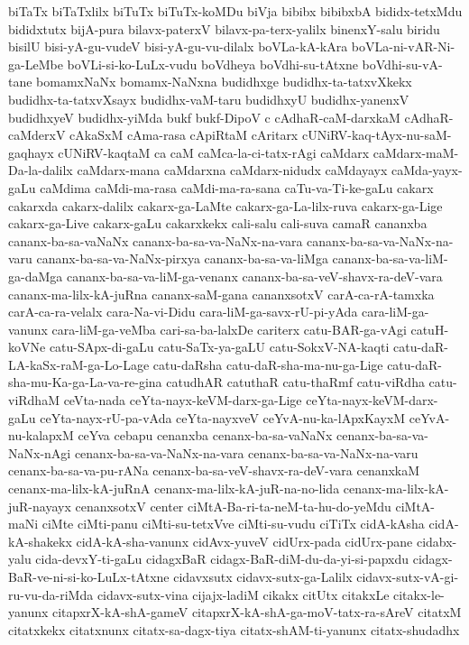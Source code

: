 {biTaTx
biTaTxlilx
biTuTx
biTuTx-koMDu
biVja
bibibx
bibibxbA
bididx-tetxMdu
bididxtutx
bijA-pura
bilavx-paterxV
bilavx-pa-terx-yalilx
binenxY-salu
biridu
bisilU
bisi-yA-gu-vudeV
bisi-yA-gu-vu-dilalx
boVLa-kA-kAra
boVLa-ni-vAR-Ni-ga-LeMbe
boVLi-si-ko-LuLx-vudu
boVdheya
boVdhi-su-tAtxne
boVdhi-su-vA-tane
bomamxNaNx
bomamx-NaNxna
budidhxge
budidhx-ta-tatxvXkekx
budidhx-ta-tatxvXsayx
budidhx-vaM-taru
budidhxyU
budidhx-yanenxV
budidhxyeV
budidhx-yiMda
bukf
bukf-DipoV
c
cAdhaR-caM-darxkaM
cAdhaR-caMderxV
cAkaSxM
cAma-rasa
cApiRtaM
cAritarx
cUNiRV-kaq-tAyx-nu-saM-gaqhayx
cUNiRV-kaqtaM
ca
caM
caMca-la-ci-tatx-rAgi
caMdarx
caMdarx-maM-Da-la-dalilx
caMdarx-mana
caMdarxna
caMdarx-nidudx
caMdayayx
caMda-yayx-gaLu
caMdima
caMdi-ma-rasa
caMdi-ma-ra-sana
caTu-va-Ti-ke-gaLu
cakarx
cakarxda
cakarx-dalilx
cakarx-ga-LaMte
cakarx-ga-La-lilx-ruva
cakarx-ga-Lige
cakarx-ga-Live
cakarx-gaLu
cakarxkekx
cali-salu
cali-suva
camaR
cananxba
cananx-ba-sa-vaNaNx
cananx-ba-sa-va-NaNx-na-vara
cananx-ba-sa-va-NaNx-na-varu
cananx-ba-sa-va-NaNx-pirxya
cananx-ba-sa-va-liMga
cananx-ba-sa-va-liM-ga-daMga
cananx-ba-sa-va-liM-ga-venanx
cananx-ba-sa-veV-shavx-ra-deV-vara
cananx-ma-lilx-kA-juRna
cananx-saM-gana
cananxsotxV
carA-ca-rA-tamxka
carA-ca-ra-velalx
cara-Na-vi-Didu
cara-liM-ga-savx-rU-pi-yAda
cara-liM-ga-vanunx
cara-liM-ga-veMba
cari-sa-ba-lalxDe
cariterx
catu-BAR-ga-vAgi
catuH-koVNe
catu-SApx-di-gaLu
catu-SaTx-ya-gaLU
catu-SokxV-NA-kaqti
catu-daR-LA-kaSx-raM-ga-Lo-Lage
catu-daRsha
catu-daR-sha-ma-nu-ga-Lige
catu-daR-sha-mu-Ka-ga-La-va-re-gina
catudhAR
catuthaR
catu-thaRmf
catu-viRdha
catu-viRdhaM
ceVta-nada
ceYta-nayx-keVM-darx-ga-Lige
ceYta-nayx-keVM-darx-gaLu
ceYta-nayx-rU-pa-vAda
ceYta-nayxveV
ceYvA-nu-ka-lApxKayxM
ceYvA-nu-kalapxM
ceYva
cebapu
cenanxba
cenanx-ba-sa-vaNaNx
cenanx-ba-sa-va-NaNx-nAgi
cenanx-ba-sa-va-NaNx-na-vara
cenanx-ba-sa-va-NaNx-na-varu
cenanx-ba-sa-va-pu-rANa
cenanx-ba-sa-veV-shavx-ra-deV-vara
cenanxkaM
cenanx-ma-lilx-kA-juRnA
cenanx-ma-lilx-kA-juR-na-no-lida
cenanx-ma-lilx-kA-juR-nayayx
cenanxsotxV
center
ciMtA-Ba-ri-ta-neM-ta-hu-do-yeMdu
ciMtA-maNi
ciMte
ciMti-panu
ciMti-su-tetxVve
ciMti-su-vudu
ciTiTx
cidA-kAsha
cidA-kA-shakekx
cidA-kA-sha-vanunx
cidAvx-yuveV
cidUrx-pada
cidUrx-pane
cidabx-yalu
cida-devxY-ti-gaLu
cidagxBaR
cidagx-BaR-diM-du-da-yi-si-papxdu
cidagx-BaR-ve-ni-si-ko-LuLx-tAtxne
cidavxsutx
cidavx-sutx-ga-Lalilx
cidavx-sutx-vA-gi-ru-vu-da-riMda
cidavx-sutx-vina
cijajx-ladiM
cikakx
citUtx
citakxLe
citakx-le-yanunx
citapxrX-kA-shA-gameV
citapxrX-kA-shA-ga-moV-tatx-ra-sAreV
citatxM
citatxkekx
citatxnunx
citatx-sa-dagx-tiya
citatx-shAM-ti-yanunx
citatx-shudadhx
}
